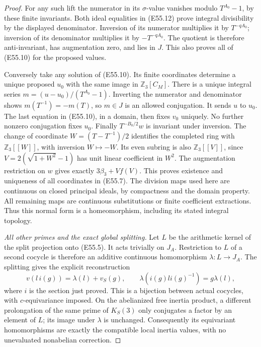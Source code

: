 \begin{proof}
For any such lift the numerator in its $\sigma$-value
vanishes modulo $T^{A_0}-1$, by these finite invariants.
Both ideal equalities in (E55.12) prove integral divisibility
by the displayed denominator. Inversion of its numerator
multiplies it by $T^{-qA_0}$; inversion of its denominator
multiplies it by $-T^{-qA_0}$. The quotient is therefore
anti-invariant, has augmentation zero, and lies in $J$.
This also proves all of (E55.10) for the proposed values.

Conversely take any solution of (E55.10). Its finite
coordinates determine a unique proposed $u_0$ with the
same image in $\mathbb Z_3[C_M]$. There is a unique
integral series
$m=(u-u_0)/(T^{A_0}-1)$. Inverting the numerator and
denominator shows $m(T^{-1})=-m(T)$, so $m\in J$ is an
allowed conjugation. It sends $u$ to $u_0$. The last
equation in (E55.10), in a domain, then fixes $v_0$
uniquely. No further nonzero conjugation fixes $u_0$.
Finally $T^{-B_0/2}w$ is invariant under inversion.
The change of coordinate $W=(T-T^{-1})/2$ identifies the
completed ring with $\mathbb Z_3[[W]]$, with inversion
$W\mapsto-W$. Its even subring is also
$\mathbb Z_3[[V]]$, since
$V=2(\sqrt{1+W^2}-1)$ has unit linear coefficient in $W^2$.
The augmentation restriction on $w$ gives exactly
$3\beta_3+Vf(V)$. This proves existence and uniqueness
of all coordinates in (E55.7).
The division maps used here are continuous on closed
principal ideals, by compactness and the domain property.
All remaining maps are continuous substitutions or finite
coefficient extractions. Thus this normal form is a
homeomorphism, including its stated integral topology.

\emph{All other primes and the exact global splitting.}
Let $L$ be the arithmetic kernel of the split projection
onto (E55.5). It acts trivially on $J_A$. Restriction to
$L$ of a second cocycle is therefore an additive continuous
homomorphism $\lambda:L\to J_A$. The splitting gives the
explicit reconstruction
\[
 v(l\,i(g))=\lambda(l)+v_S(g),\qquad
 \lambda(i(g)li(g)^{-1})=g\lambda(l),                         \tag{E55.13}
\]
where $i$ is the section just proved. This is a bijection
between actual cocycles, with $c$-equivariance imposed.
On the abelianized free inertia product, a different
prolongation of the same prime of $K_S(3)$ only conjugates
a factor by an element of $L$;
its image under $\lambda$ is unchanged. Consequently its
equivariant homomorphisms are exactly the compatible local
inertia values, with no unevaluated nonabelian correction.


\end{proof}
